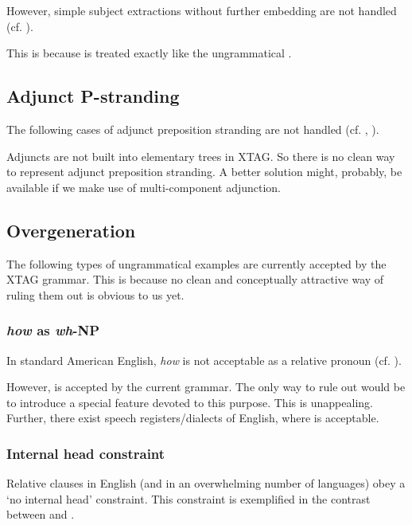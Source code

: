 However, simple subject extractions without further embedding are not
handled (cf. ).

\enumsentence{who(ever) [ $\epsilon$$_{w_{i}}$ [ $\epsilon$$_{i}$ likes Bill ]]]}
This is because  is treated exactly like the ungrammatical .
\enumsentence{*the person [ $\epsilon$$_{w_{i}}$ [ $\epsilon$$_{i}$ likes Bill ]]]}


\subsection{Adjunct P-stranding}
The following cases of adjunct preposition stranding are not handled 
(cf. , ).


Adjuncts are not built into elementary trees in XTAG. So there is no
clean way to represent adjunct preposition stranding. A better
solution might, probably, be available if we make use of multi-component
adjunction. 

\subsection{Overgeneration}
The following types of ungrammatical examples are currently accepted by
the XTAG grammar. This is because no clean and conceptually attractive way
of ruling them out is obvious to us yet.

\subsubsection{{\em how} as {\em wh}-NP}
In standard American English, {\em how} is not acceptable as a 
relative pronoun (cf. ).

\enumsentence{*the way [ how [ PRO to solve this problem ]]]}

However,  is accepted by the current grammar.
The only way to rule  out would be to introduce a special feature
devoted to this purpose. This is unappealing. Further, there exist
speech registers/dialects of English, where  is acceptable. 

\subsubsection{Internal head constraint}
Relative clauses in English (and in an overwhelming number of languages)
obey a `no internal head' constraint. This constraint is exemplified in
the contrast between  and .

